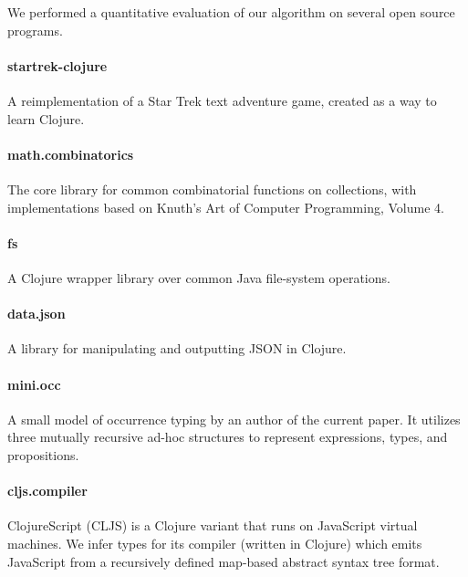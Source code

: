\label{infer:chap:evaluation}

We performed a quantitative evaluation of our algorithm
on several open source programs.

\paragraph{startrek-clojure}
A reimplementation of a Star Trek text adventure game,
created as a way to learn Clojure.

\paragraph{math.combinatorics}
The core library for common combinatorial functions
on collections,
with implementations based on Knuth's Art of Computer
Programming, Volume 4.

\paragraph{fs}
A Clojure wrapper library over common Java file-system operations.

\paragraph{data.json}
A library for manipulating and outputting JSON in Clojure.


\paragraph{mini.occ}
A small model of occurrence typing by an author of the
current paper. It utilizes three mutually recursive
ad-hoc structures to represent expressions, types,
and propositions.

\paragraph{cljs.compiler}
ClojureScript (CLJS) is a Clojure variant that runs on JavaScript
virtual machines. We infer types for its compiler (written in Clojure)
which emits JavaScript from
a recursively defined map-based abstract syntax tree format.

